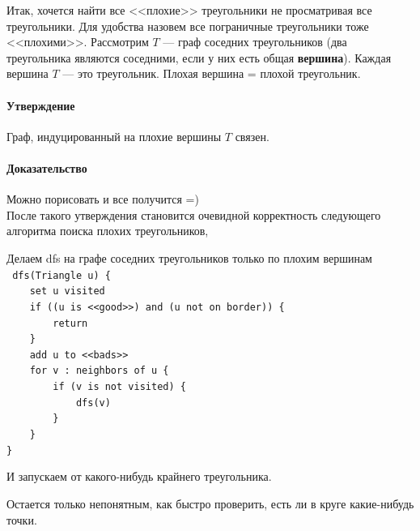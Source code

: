 \documentclass{article}
\begin{document}
	Итак, хочется найти все <<плохие>> треугольники не просматривая все треугольники. Для удобства назовем все пограничные треугольники тоже <<плохими>>. Рассмотрим $T$ --- граф соседних треугольников (два треугольника являются соседними, если у них есть общая {\bf вершина}). Каждая вершина $T$ --- это треугольник. Плохая вершина = плохой треугольник. 
	
	\paragraph{Утверждение\\}
	    Граф, индуцированный на плохие вершины $T$ связен.
	\paragraph{Доказательство\\}
	    Можно порисовать и все получится =)\\
	    
    После такого утверждения становится очевидной корректность следующего алгоритма поиска плохих треугольников,
    
    Делаем dfs на графе соседних треугольников только по плохим вершинам\\
    
        {\tt
            \noindent dfs(Triangle u) \{ \\
            \phantom ~~~~set u visited    \\
            \phantom ~~~~if ((u is <<good>>) and (u not on border)) \{    \\
            \phantom ~~~~~~~~return    \\
            \phantom ~~~~\}    \\            
            \phantom ~~~~add u to <<bads>>    \\ 
            \phantom ~~~~for v : neighbors of u \{   \\ 
            \phantom ~~~~~~~~if (v is not visited) \{    \\
            \phantom ~~~~~~~~~~~~dfs(v)    \\            
            \phantom ~~~~~~~~\}    \\
            \phantom ~~~~\}    \\
                     \}    \\
        }
      
    И запускаем от какого-нибудь крайнего треугольника.  
    	    
    	    
    	Остается только непонятным, как быстро проверить, есть ли в круге какие-нибудь точки. 
    	
\end{document}
